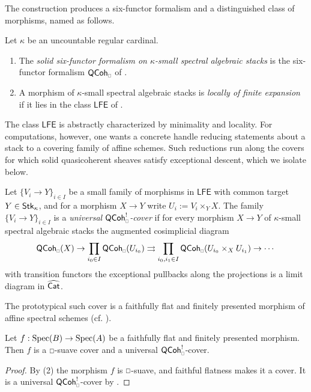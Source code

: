 The construction produces a six-functor formalism and a distinguished class of morphisms, named as follows.
\begin{definition}\label{def: solid six-functor formalism on stacks}
    Let $\kappa$ be an uncountable regular cardinal.
    \begin{enumerate}
        \item The \emph{solid six-functor formalism on $\kappa$-small spectral algebraic stacks} is the six-functor formalism $\QCoh_{\sld}$ of .
        \item A morphism of $\kappa$-small spectral algebraic stacks is \emph{locally of finite expansion} if it lies in the class $\mathsf{LFE}$ of .
    \end{enumerate}
\end{definition}
The class $\mathsf{LFE}$ is abstractly characterized by minimality and locality. For computations, however, one wants a concrete handle reducing statements about a stack to a covering family of affine schemes. Such reductions run along the covers for which solid quasicoherent sheaves satisfy exceptional descent, which we isolate below. 
\begin{definition}\label{def: universal QCoh-cover}
    Let $\{V_{i}\to Y\}_{i\in I}$ be a small family of morphisms in $\mathsf{LFE}$ with common target $Y\in\mathsf{Stk}_{\kappa}$, and for a morphism $X\to Y$ write $U_{i}:=V_{i}\times_{Y}X$. The family $\{V_{i}\to Y\}_{i\in I}$ is a \emph{universal $\QCoh^{!}_{\sld}$-cover} if for every morphism $X\to Y$ of $\kappa$-small spectral algebraic stacks the augmented cosimplicial diagram
    $$\QCoh_{\sld}(X)\to\prod_{i_{0}\in I}\QCoh_{\sld}(U_{i_{0}})\rightrightarrows\prod_{i_{0},i_{1}\in I}\QCoh_{\sld}(U_{i_{0}}\times_{X}U_{i_{1}})\to\cdots$$
    with transition functors the exceptional pullbacks along the projections is a limit diagram in $\widehat{\mathsf{Cat}}$.
\end{definition}
The prototypical such cover is a faithfully flat and finitely presented morphism of affine spectral schemes (cf. ).
\begin{lemma}\label{lem: ffp is universal cover}
    Let $f:\operatorname{Spec}(B)\to\operatorname{Spec}(A)$ be a faithfully flat and finitely presented morphism. Then $f$ is a $\msld$-suave cover and a universal $\QCoh^{!}_{\sld}$-cover.
\end{lemma}
\begin{proof}
    By  (2) the morphism $f$ is $\msld$-suave, and faithful flatness makes it a cover. It is a universal $\QCoh^{!}_{\sld}$-cover by \cite[Lem. 4.7.1]{HeyerMann6FF}.
\end{proof}

